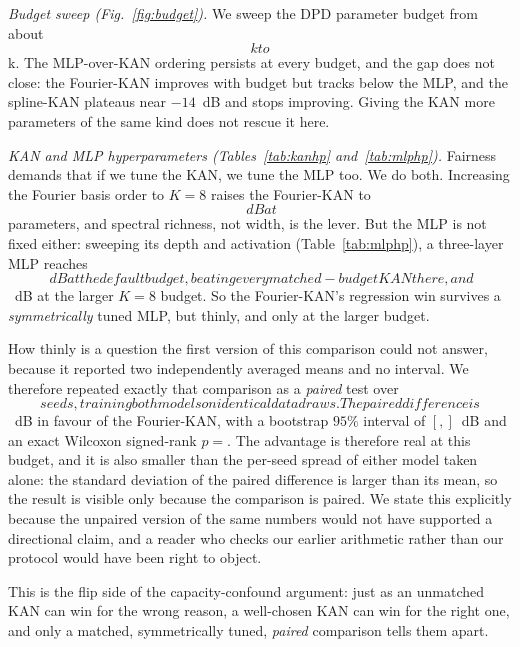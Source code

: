 \documentclass[final,5p,times]{elsarticle}
\begin{document}
\emph{Budget sweep (Fig.~\ref{fig:budget}).} We sweep the DPD parameter budget from about
$$k to $$k. The MLP-over-KAN ordering persists at every budget, and the gap does not
close: the Fourier-KAN improves with budget but tracks below the MLP, and the spline-KAN
plateaus near $-14$~dB and stops improving. Giving the KAN more parameters of the same kind
does not rescue it here.

\emph{KAN and MLP hyperparameters (Tables~\ref{tab:kanhp} and~\ref{tab:mlphp}).} Fairness
demands that if we tune the KAN, we tune the MLP too. We do both. Increasing the Fourier basis
order to $K=8$ raises the Fourier-KAN to $$~dB at
$$ parameters, and spectral richness, not width, is the lever.
But the MLP is not fixed either: sweeping its depth and activation
(Table~\ref{tab:mlphp}), a three-layer MLP reaches $$~dB at
the default budget, beating every matched-budget KAN there, and $$~dB
at the larger $K=8$ budget. So the Fourier-KAN's regression win survives a \emph{symmetrically}
tuned MLP, but thinly, and only at the larger budget.

How thinly is a question the first version of this comparison could not answer, because it
reported two independently averaged means and no interval. We therefore repeated exactly that
comparison as a \emph{paired} test over $$ seeds, training both models
on identical data draws. The paired difference is
$$~dB in favour of the Fourier-KAN, with a bootstrap
$95\%$ interval of $[, ]$~dB and an
exact Wilcoxon signed-rank $p=$. The advantage is therefore real at
this budget, and it is also smaller than the per-seed spread of either model taken alone: the
standard deviation of the paired difference is larger than its mean, so the result is visible
only because the comparison is paired. We state this explicitly because the unpaired version of
the same numbers would not have supported a directional claim, and a reader who checks our
earlier arithmetic rather than our protocol would have been right to object.

This is the flip side of the capacity-confound argument: just as an unmatched KAN can win for
the wrong reason, a well-chosen KAN can win for the right one, and only a matched,
symmetrically tuned, \emph{paired} comparison tells them apart.
\end{document}
